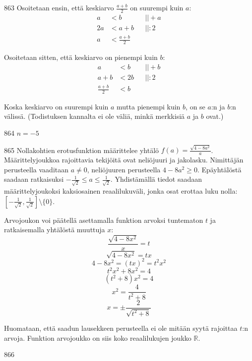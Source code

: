 \begin{Vastaus}{863}
	Osoitetaan ensin, että keskiarvo $\frac{a+b}{2}$ on suurempi kuin $a$:
	\begin{align*}
	a&<b && ||+a \\
	2a&<a+b && ||:2 \\
	a&<\frac{a+b}{2} &&
	\end{align*}

	Osoitetaan sitten, että keskiarvo on pienempi kuin $b$:
	\begin{align*}
	a&<b && ||+b \\
	a+b&<2b && ||:2 \\
	\frac{a+b}{2}&<b &&
	\end{align*}

	Koska keskiarvo on suurempi kuin $a$ mutta pienempi kuin $b$, on se $a$:n ja $b$:n välissä. (Todistuksen kannalta ei ole väliä, minkä merkkisiä $a$ ja $b$ ovat.)
	
\end{Vastaus}
\begin{Vastaus}{864}
	$n=-5$
	
\end{Vastaus}
\begin{Vastaus}{865}
	Nollakohtien erotusfunktion määrittelee yhtälö $f(a)=\frac{\sqrt{4-8a^2}}{a}$. Määrittelyjoukkoa rajoittavia tekijöitä ovat neliöjuuri ja jakolasku. Nimittäjän perusteella vaaditaan $a\neq 0$, neliöjuuren perusteella $4-8a^2\geq 0$. Epäyhtälöstä saadaan ratkaisuksi $-\frac{1}{\sqrt{2}}\leq a \leq \frac{1}{\sqrt{2}}$. Yhdistämällä tiedot saadaan määrittelyjoukoksi kaksiosainen reaalilukuväli, jonka osat erottaa luku nolla: $[-\frac{1}{\sqrt{2}},\frac{1}{\sqrt{2}}] \setminus \lbrace 0 \rbrace$. %

Arvojoukon voi päätellä asettamalla funktion arvoksi tuntematon $t$ ja ratkaisemalla yhtälöstä muuttuja $x$:
	$$\frac{\sqrt{4-8x^2}}{x}=t$$
	$$\sqrt{4-8x^2}=tx$$
	$$4-8x^2=(tx)^2=t^2x^2$$
	$$t^2x^2+8x^2=4$$
	$$(t^2+8)x^2=4$$
	$$x^2=\frac{4}{t^2+8}$$
	$$x=\pm \frac{2}{\sqrt{t^2+8}}$$

	Huomataan, että saadun lausekkeen perusteella ei ole mitään syytä rajoittaa $t$:n arvoja. Funktion arvojoukko on siis koko reaalilukujen joukko $\mathbb{R}$.
	
\end{Vastaus}
\begin{Vastaus}{866}
	
\end{Vastaus}
